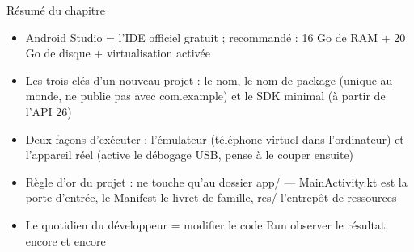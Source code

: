 \begin{tcbsummary}{Résumé du chapitre}
\begin{itemize}
  \item Android Studio = l'IDE officiel gratuit ; recommandé : 16 Go de RAM + 20 Go de disque + virtualisation activée
  \item Les trois clés d'un nouveau projet : le nom, le nom de package (unique au monde, ne publie pas avec com.example) et le SDK minimal (à partir de l'API 26)
  \item Deux façons d'exécuter : l'émulateur (téléphone virtuel dans l'ordinateur) et l'appareil réel (active le débogage USB, pense à le couper ensuite)
  \item Règle d'or du projet : ne touche qu'au dossier app/ — MainActivity.kt est la porte d'entrée, le Manifest le livret de famille, res/ l'entrepôt de ressources
  \item Le quotidien du développeur = modifier le code Run observer le résultat, encore et encore
\end{itemize}

\end{tcbsummary}
